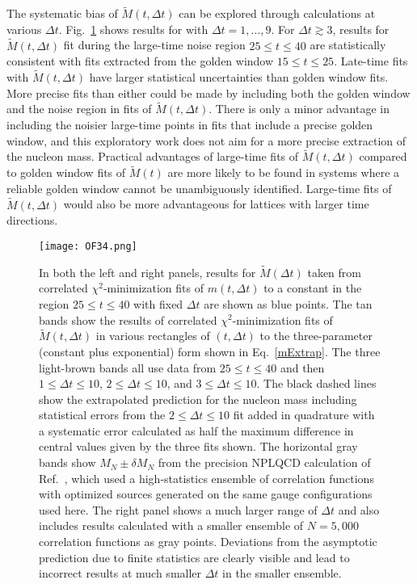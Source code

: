 The systematic bias of $\tilde{M}(t, \Delta t)$ can be explored through calculations at various $\Delta t$. 
Fig.~\ref{WEMSysErrors} shows results for with $\Delta t = 1,\dots,9$. 
For $\Delta t \gtrsim 3$, results for $\tilde{M}(t, \Delta t)$ fit during the large-time noise region $25 \leq t \leq 40$ are statistically 
consistent with fits extracted from the golden window $15 \leq t \leq 25$. 
Late-time fits with $\tilde{M}(t, \Delta t)$ have larger statistical uncertainties than golden window fits. 
More precise fits than either could be made by including both the golden window and the noise region in fits of $\tilde{M}(t, \Delta t)$. 
There is only a minor advantage in including the noisier large-time points in fits that include a precise golden window, 
and this exploratory work does not aim for a more precise extraction of the nucleon mass. 
Practical advantages of large-time fits of $\tilde{M}(t, \Delta t)$ compared to golden window fits of $\tilde{M}(t)$ are more likely to 
be found in systems where a reliable golden window cannot be unambiguously identified. 
Large-time fits of $\tilde{M}(t, \Delta t)$ would also be more advantageous for lattices with larger time directions.
%
\begin{figure}[!ht]
  \centering
  \texttt{[image: OF34.png]}
  \caption{
    In both the left and right panels, results for $\tilde{M}(\Delta t)$ taken from correlated $\chi^2$-minimization fits of $m(t, \Delta t)$ to a constant in the region $25\leq t \leq 40$ with fixed  $\Delta t$ are shown as blue points.
    The tan bands show the results of correlated $\chi^2$-minimization fits of $\tilde{M}(t,\Delta t)$ in various rectangles of $(t,\Delta t)$ to the three-parameter (constant plus exponential) form shown in Eq.~\eqref{mExtrap}.
  The three light-brown bands all use data from $25 \leq t\leq 40$ and then $1\leq \Delta t \leq 10$, $2\leq \Delta t \leq 10$, and $3\leq \Delta t\leq 10$.
  The black dashed lines show the extrapolated prediction for the nucleon mass including statistical errors from the $2\leq \Delta t \leq 10$ fit added in quadrature with a systematic error calculated as half the maximum difference in central values given by the three fits shown.
 The horizontal gray bands show $M_N \pm \delta M_N$ from the precision NPLQCD calculation of Ref.~\cite{Orginos:2015aya}, which used a high-statistics ensemble of correlation functions with optimized sources generated on the same gauge configurations used here.
 The right panel shows a much larger range of $\Delta t$ and also includes results calculated with a smaller ensemble of $N=5,000$ correlation functions as gray points.
 Deviations from the asymptotic prediction due to finite statistics are clearly visible and lead to incorrect results at much smaller $\Delta t$ in the smaller ensemble.
 }
  \label{WEMSysErrors}
\end{figure}
%






